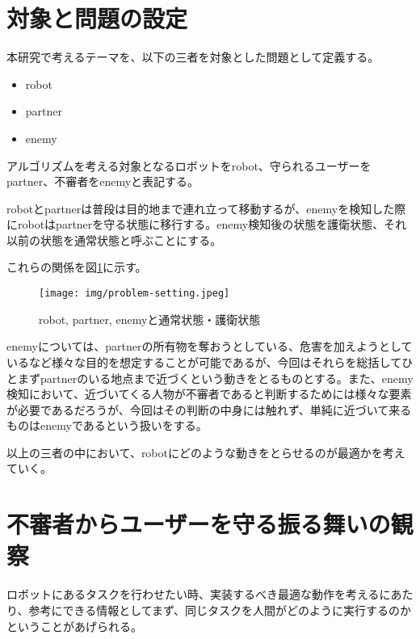 \documentclass{kuisthesis}
\begin{document}
\section{対象と問題の設定}
本研究で考えるテーマを、以下の三者を対象とした問題として定義する。

\begin{itemize}
	\item robot
	\item partner
	\item enemy
\end{itemize}

アルゴリズムを考える対象となるロボットをrobot、守られるユーザーをpartner、不審者をenemyと表記する。

robotとpartnerは普段は目的地まで連れ立って移動するが、enemyを検知した際にrobotはpartnerを守る状態に移行する。enemy検知後の状態を護衛状態、それ以前の状態を通常状態と呼ぶことにする。

これらの関係を図\ref{fig:problem-setting}に示す。

\begin{figure}[h]\begin{center}
	\texttt{[image: img/problem-setting.jpeg]}
	\caption{robot, partner, enemyと通常状態・護衛状態}
	\label{fig:problem-setting}
\end{center}\end{figure}

enemyについては、partnerの所有物を奪おうとしている、危害を加えようとしているなど様々な目的を想定することが可能であるが、今回はそれらを総括してひとまずpartnerのいる地点まで近づくという動きをとるものとする。また、enemy検知において、近づいてくる人物が不審者であると判断するためには様々な要素が必要であるだろうが、今回はその判断の中身には触れず、単純に近づいて来るものはenemyであるという扱いをする。

以上の三者の中において、robotにどのような動きをとらせるのが最適かを考えていく。






\section{不審者からユーザーを守る振る舞いの観察}

ロボットにあるタスクを行わせたい時、実装するべき最適な動作を考えるにあたり、参考にできる情報としてまず、同じタスクを人間がどのように実行するのかということがあげられる。
\end{document}
